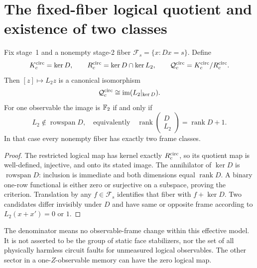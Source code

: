 \section{The fixed-fiber logical quotient and existence of two classes}
\label{sec:cl-quotient}
\begin{theorem}\label{thm:cl-quotient}
Fix stage~1 and a nonempty stage-2 fiber $\mathcal F_s=\{x:Dx=s\}$.
Define
\[
 K_c^{\rm circ}=\ker D,\qquad R_c^{\rm circ}=\ker D\cap\ker L_2,
 \qquad \mathcal Q_c^{\rm circ}=K_c^{\rm circ}/R_c^{\rm circ}.
\]
Then $[z]\mapsto L_2z$ is a canonical isomorphism
\begin{equation}
 \mathcal Q_c^{\rm circ}\cong\operatorname{im}(L_2|_{\ker D}).
 \label{eq:cl-quotient}
\end{equation}
For one observable the image is $\mathbb F_2$ if and only if
\begin{equation}
 L_2\notin\operatorname{rowspan}D,
 \quad\text{equivalently}\quad
 \operatorname{rank}\begin{pmatrix}D\\L_2\end{pmatrix}
       =\operatorname{rank}D+1.                       \label{eq:cl-rank}
\end{equation}
In that case every nonempty fiber has exactly two frame classes.
\end{theorem}
\begin{proof}
The restricted logical map has kernel exactly $R_c^{\rm circ}$, so its
quotient map is well-defined, injective, and onto its stated image.
The annihilator of $\ker D$ is $\operatorname{rowspan}D$: inclusion is
immediate and both dimensions equal $\operatorname{rank}D$. A binary
one-row functional is either zero or surjective on a subspace, proving
the criterion. Translation by any $f\in\mathcal F_s$ identifies that
fiber with $f+\ker D$. Two candidates differ invisibly under $D$ and have
same or opposite frame according to $L_2(x+x')=0$ or $1$.
\end{proof}
The denominator means no observable-frame change within this effective
model. It is not asserted to be the group of static face stabilizers,
nor the set of all physically harmless circuit faults for unmeasured
logical observables. The other sector in a one-$Z$-observable memory
can have the zero logical map.

